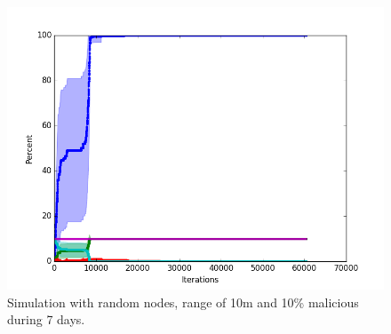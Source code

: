 \documentclass[conference]{IEEEtran}
\begin{document}

\begin{figure}
\centering
\includegraphics[width=\linewidth]{Network_rA7/10_10}
\caption{Simulation with random nodes, range of 10m and 10\% malicious during 7 days.} \label{fig:random7}
\end{figure}

\end{document}
